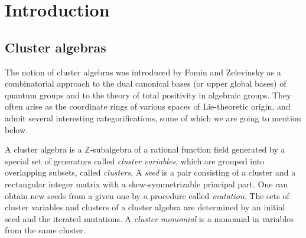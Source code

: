 \documentclass[12pt]{amsart}
\theoremstyle{definition}
\theoremstyle{remark}
\numberwithin{equation}{section}
\begin{document}
\maketitle

\setcounter{tocdepth}{1}
\tableofcontents

\section{Introduction}

\subsection{Cluster algebras} The notion of cluster algebras was introduced by Fomin and Zelevinsky \cite{fz_2002}  as a combinatorial approach to the dual canonical bases (or upper global bases) of quantum groups and to the theory of total positivity in algebraic groups. They often arise as the coordinate rings of various spaces of Lie-theoretic origin, and admit several interesting categorifications, some of which we are going to mention below.

A cluster algebra is a $\mathbb Z$-subalgebra of a rational function field generated by a special set of
generators called {\em cluster variables}, which are grouped into overlapping subsets,
called {\em clusters}. A {\em seed} is a pair consisting of a cluster and a rectangular
integer matrix with a skew-symmetrizable principal part. One can obtain new seeds from a given one by a procedure called {\em mutation}.
The sets of cluster variables and clusters of a cluster algebra are determined by an initial seed and the iterated mutations.
 A {\em cluster monomial} is a monomial in variables from the same cluster. 
 
\end{document}
